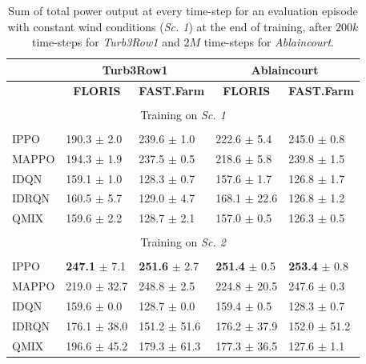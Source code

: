 \documentclass{article}
\newcommand{\ra}[1]
{\renewcommand{\arraystretch}{#1}}
\begin{document}
\begin{table}[!htb]
\ra{1.2}
\centering
\begin{tabular}{lllll}
 & \multicolumn{2}{c}{\textbf{Turb3Row1}} & \multicolumn{2}{c}{\textbf{Ablaincourt}} \\
\hline
 & \multicolumn{1}{c}{\textbf{FLORIS}} & \textbf{FAST.Farm}& \multicolumn{1}{c}{\textbf{FLORIS}} & \textbf{FAST.Farm}\\
 \hline
& & & & \\
\multicolumn{5}{c}{Training on \textit{Sc. 1}} \\
& & & & \\
IPPO & 190.3 $\pm$ 2.0 & 239.6 $\pm$ 1.0 & 222.6 $\pm$ 5.4 & 245.0 $\pm$ 0.8 \\
MAPPO & 194.3 $\pm$ 1.9 & 237.5 $\pm$ 0.5 & 218.6 $\pm$ 5.8 & 239.8 $\pm$ 1.5 \\
IDQN & 159.1 $\pm$ 1.0 & 128.3 $\pm$ 0.7 & 157.6 $\pm$ 1.7 & 126.8 $\pm$ 1.7 \\
IDRQN & 160.5 $\pm$ 5.7 & 129.0 $\pm$ 4.7 & 168.1 $\pm$ 22.6 & 126.8 $\pm$ 1.2 \\
QMIX & 159.6 $\pm$ 2.2 & 128.7 $\pm$ 2.1 & 157.0 $\pm$ 0.5 & 126.3 $\pm$ 0.5 \\
\hline
& & & &  \\
\multicolumn{5}{c}{Training on \textit{Sc. 2}} \\
& & & & \\
IPPO & \textbf{247.1} $\pm$ 7.1 & \textbf{251.6} $\pm$ 2.7 & \textbf{251.4} $\pm$ 0.5 & \textbf{253.4} $\pm$ 0.8 \\
MAPPO & 219.0 $\pm$ 32.7 & 248.8 $\pm$ 2.5 & 224.8 $\pm$ 20.5 & 247.6 $\pm$ 0.3 \\
IDQN & 159.6 $\pm$ 0.0 & 128.7 $\pm$ 0.0 & 159.4 $\pm$ 0.5 & 128.3 $\pm$ 0.7 \\
IDRQN & 176.1 $\pm$ 38.0 & 151.2 $\pm$ 51.6 & 176.2 $\pm$ 37.9 & 152.0 $\pm$ 51.2 \\
QMIX & 196.6 $\pm$ 45.2 & 179.3 $\pm$ 61.3 & 177.3 $\pm$ 36.5 & 127.6 $\pm$ 1.1
\end{tabular}
\caption{Sum of total power output at every time-step for an evaluation episode with constant wind conditions (\textit{Sc. 1})  at the end of training, after $200k$ time-steps for \textit{Turb3Row1} and $2M$ time-steps for \textit{Ablaincourt}.} 
\label{tab:train_powers}
\end{table}
\end{document}
